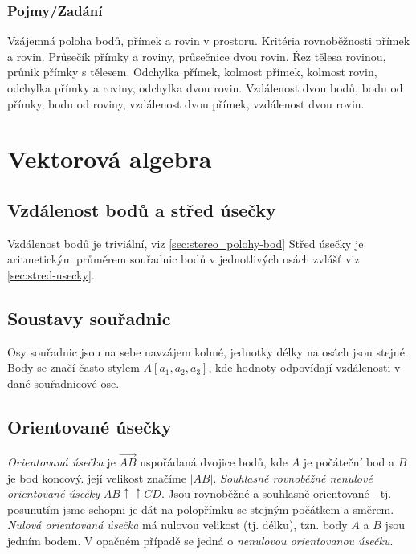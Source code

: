 \documentclass[12pt]{article}
\begin{document}
\subsubsection{Pojmy/Zadání}
Vzájemná poloha bodů, přímek a rovin v prostoru. Kritéria rovnoběžnosti přímek a rovin. Průsečík přímky a roviny, průsečnice dvou rovin. Řez tělesa rovinou, průnik přímky s tělesem. Odchylka přímek, kolmost přímek, kolmost rovin, odchylka přímky a roviny, odchylka dvou rovin. Vzdálenost dvou bodů, bodu od přímky, bodu od roviny, vzdálenost dvou přímek, vzdálenost dvou rovin.

\section{Vektorová algebra}
\subsection{Vzdálenost bodů a střed úsečky}
Vzdálenost bodů je triviální, viz \ref{sec:stereo_polohy-bod} Střed úsečky je aritmetickým průměrem souřadnic bodů v jednotlivých osách zvlášť viz \ref{sec:stred-usecky}.
\subsection{Soustavy souřadnic}
Osy souřadnic jsou na sebe navzájem kolmé, jednotky délky na osách jsou stejné. Body se značí často stylem $A[a_1, a_2, a_3]$, kde hodnoty odpovídají vzdálenosti v dané souřadnicové ose.

\subsection{Orientované úsečky}
\emph{Orientovaná úsečka} je $\overrightarrow{AB}$ uspořádaná dvojice bodů, kde $A$ je počáteční bod a $B$ je bod koncový. její velikost značíme $|AB|$. \emph{Souhlasně rovnoběžné nenulové orientované úsečky} $AB \uparrow \uparrow CD$. Jsou rovnoběžné a souhlasně orientované - tj. posunutím jsme schopni je dát na polopřímku se stejným počátkem a směrem.\\
\emph{Nulová orientovaná úsečka} má nulovou velikost (tj. délku), tzn. body $A$ a $B$ jsou jedním bodem. V opačném případě se jedná o \emph{nenulovou orientovanou úsečku}.
\end{document}
